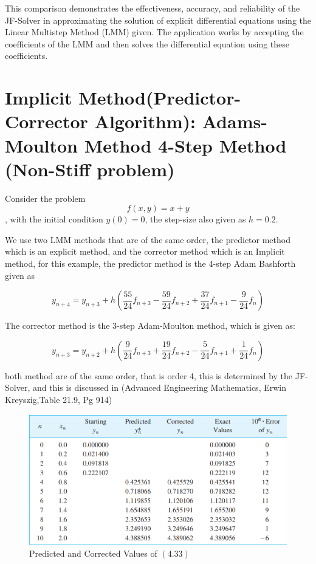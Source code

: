 This comparison demonstrates the effectiveness, accuracy, and reliability of the JF-Solver in approximating the solution of explicit differential equations using the Linear Multistep Method (LMM) given. The application works by accepting the coefficients of the LMM and then solves the differential equation using these coefficients.

\section{Implicit Method(Predictor-Corrector Algorithm): Adams-Moulton Method 4-Step Method (Non-Stiff problem)}

Consider the problem \begin{equation}
    f(x,y) = x + y
\end{equation}, with the initial condition $y(0) = 0$, the step-size also given as $h = 0.2$.

We use two LMM methods that are of the same order, the predictor method which is an explicit method, and the corrector method which is an Implicit method, for this example, the predictor method is the 4-step Adam Bashforth given as

\begin{equation}
    y_{n+4}  = y_{n+3} + h \left(\frac{55}{24}f_{n+3} - \frac{59}{24}f_{n+2} + \frac{37}{24}f_{n+1} - \frac{9}{24}f_{n}\right)
\end{equation}

The corrector method is the 3-step Adam-Moulton method, which is given as:

\begin{equation}
    y_{n+3}  = y_{n+2} + h \left(\frac{9}{24}f_{n+3} + \frac{19}{24}f_{n+2} - \frac{5}{24}f_{n+1} + \frac{1}{24}f_{n}\right)
\end{equation}

both method are of the same order, that is order 4, this is determined by the JF-Solver, and this is discussed in  (Advanced Engineering Mathematics, Erwin Kreyszig,Table 21.9, Pg 914)

\begin{figure}[htbp]
    \centering
    \includegraphics[width=1\textwidth]{chapters/4/image/solver_4.png}
    \caption{Predicted and Corrected Values of $(4.33)$ }
\end{figure}



